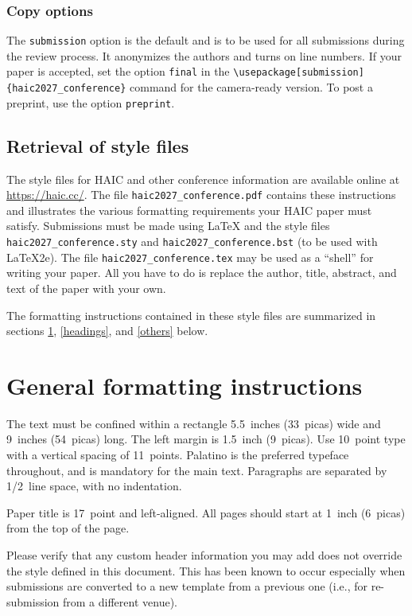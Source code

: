 \documentclass{article} %
\begin{document}
\subsubsection{Copy options}

The {\tt submission} option is the default and is to be used for all
submissions during the review process. It anonymizes the authors and turns on
line numbers. If your paper is accepted, set the option {\tt final} in the
{\tt {\textbackslash}usepackage[submission]\{haic2027\_conference\}} command for
the camera-ready version. To post a preprint, use the option {\tt preprint}.

\subsection{Retrieval of style files}

The style files for HAIC and other conference information are available
online at \url{https://haic.cc/}.
The file \verb+haic2027_conference.pdf+ contains these
instructions and illustrates the
various formatting requirements your HAIC paper must satisfy.
Submissions must be made using \LaTeX{} and the style files
\verb+haic2027_conference.sty+ and \verb+haic2027_conference.bst+ (to be used
with \LaTeX{}2e). The file \verb+haic2027_conference.tex+ may be used as a
``shell'' for writing your paper. All you have to do is replace the author,
title, abstract, and text of the paper with your own.

The formatting instructions contained in these style files are summarized in
sections \ref{gen_inst}, \ref{headings}, and \ref{others} below.

\section{General formatting instructions}
\label{gen_inst}

The text must be confined within a rectangle 5.5~inches (33~picas) wide and
9~inches (54~picas) long. The left margin is 1.5~inch (9~picas).
Use 10~point type with a vertical spacing of 11~points. Palatino is the
preferred typeface throughout, and is mandatory for the main text. Paragraphs
are separated by 1/2~line space, with no indentation.

Paper title is 17~point and left-aligned.
All pages should start at 1~inch (6~picas) from the top of the page.

Please verify that any custom header information you may add does not
override the style defined in this document. This has been known to occur
especially when submissions are converted to a new template from a previous
one (i.e., for re-submission from a different venue).
\end{document}
